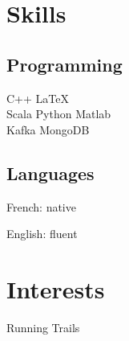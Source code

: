\documentclass[]{deedy-resume-openfont}
\begin{document}
\begin{minipage}[t]{0.33\textwidth}

\vspace{\topsep} %
\section{Skills}

\subsection{Programming}
C++ \textbullet{} \LaTeX \\ 
Scala \textbullet{} Python \textbullet{} Matlab \\
Kafka \textbullet{} MongoDB
\sectionsep

\subsection{Languages}
\vspace{\topsep}
\begin{tightemize}
\item French: native
\item English: fluent
\end{tightemize}


\vspace{\topsep} %
\section{Interests}
Running \textbullet Trails

%
%

\end{minipage} 
\hfill
\end{document}
